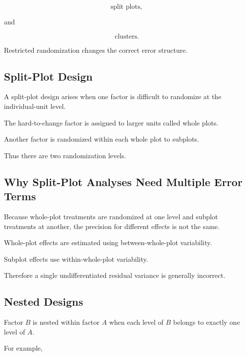 \[
\boxed{
\text{split plots},
}
\]

and

\[
\boxed{
\text{clusters}.
}
\]

Restricted randomization changes the correct error structure.

\subsection{Split-Plot Design}
\label{subsec:split-plot-design}

A split-plot design arises when one factor is difficult to randomize at
the individual-unit level.

The hard-to-change factor is assigned to larger units called whole
plots.

Another factor is randomized within each whole plot to subplots.

Thus there are two randomization levels.

\subsection{Why Split-Plot Analyses Need Multiple Error Terms}
\label{subsec:split-plot-error-terms}

Because whole-plot treatments are randomized at one level and subplot
treatments at another, the precision for different effects is not the
same.

Whole-plot effects are estimated using between-whole-plot variability.

Subplot effects use within-whole-plot variability.

Therefore a single undifferentiated residual variance is generally
incorrect.

\subsection{Nested Designs}
\label{subsec:nested-design}

Factor \(B\) is nested within factor \(A\) when each level of \(B\)
belongs to exactly one level of \(A\).

For example,

